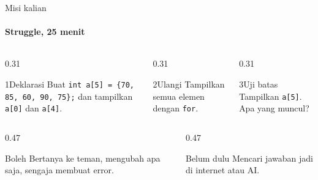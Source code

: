 \documentclass[t]{beamer}
\begin{document}
\begin{frame}{Misi kalian}
\framesubtitle{Struggle, 25 menit}
\begin{columns}[T]
\begin{column}{0.31\textwidth}
\begin{Langkah}{1}{Deklarasi}
Buat \texttt{int a[5] = \{70, 85, 60, 90, 75\};} dan tampilkan \texttt{a[0]} dan \texttt{a[4]}.
\end{Langkah}
\end{column}
\begin{column}{0.31\textwidth}
\begin{Langkah}{2}{Ulangi}
Tampilkan semua elemen dengan \texttt{for}.
\end{Langkah}
\end{column}
\begin{column}{0.31\textwidth}
\begin{Langkah}{3}{Uji batas}
Tampilkan \texttt{a[5]}. Apa yang muncul?
\end{Langkah}
\end{column}
\end{columns}
\vspace{8pt}
\begin{columns}[T]
\begin{column}{0.47\textwidth}
\begin{Blok}{Boleh}
Bertanya ke teman, mengubah apa saja, sengaja membuat error.
\end{Blok}
\end{column}
\begin{column}{0.47\textwidth}
\begin{BlokAlert}{Belum dulu}
Mencari jawaban jadi di internet atau AI.
\end{BlokAlert}
\end{column}
\end{columns}
\end{frame}
\end{document}
